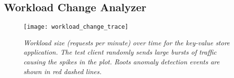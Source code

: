

\subsection{Workload Change Analyzer}

\begin{figure}
\centering
\texttt{[image: workload\_change\_trace]}
\caption{\textit{Workload size (requests per minute) over time for the key-value store application. The test client randomly sends
large bursts of traffic causing the spikes in the plot. Roots anomaly detection events are shown
in red dashed lines.}}
\label{fig:workload_change}
\end{figure}

